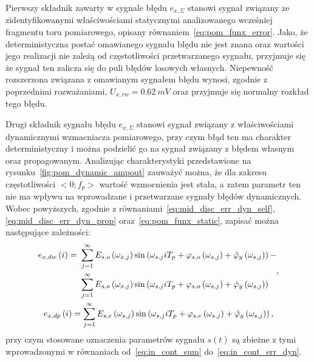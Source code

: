 Pierwszy składnik zawarty w sygnale błędu $e_{x,\Sigma}$ stanowi sygnał związany ze zidentyfikowanymi właściwościami statycznymi analizowanego wcześniej fragmentu toru pomiarowego, opisany równaniem~\eqref{eq:pom_funx_error}. Jako, że deterministyczna postać omawianego sygnału błędu nie jest znana oraz wartości jego realizacji nie zależą od częstotliwości przetwarzanego sygnału, przyjmuje się że sygnał ten zalicza się do puli błędów losowych własnych. Niepewność rozszerzona związana z omawianym sygnałem błędu wynosi, zgodnie z poprzednimi rozważaniami, $U_{x,rw} = \qty{0.62}{mV}$ oraz przyjmuje się normalny rozkład tego błędu.

Drugi składnik sygnału błędu $e_{x,\Sigma}$ stanowi sygnał związany z właściwościami dynamicznymi wzmacniacza pomiarowego, przy czym błąd ten ma charakter deterministyczny i można podzielić go na sygnał związany z błędem własnym oraz propagowanym. Analizując charakterystyki przedstawione na rysunku~\ref{fig:pom_dynamic_ampout} zauważyć można, że dla zakresu częstotliwości $<0; f_{p}>$ wartość wzmocnienia jest stała, a zatem parametr ten nie ma wpływu na wprowadzane i przetwarzane sygnały błędów dynamicznych. Wobec powyższych, zgodnie z równaniami~\eqref{eq:mid_disc_err_dyn_self}, \eqref{eq:mid_disc_err_dyn_prop} oraz~\eqref{eq:pom_funx_static}, zapisać można następujące zależności:
\begin{gather}
\begin{split}
e_{x,dw} \left(i\right) =~
& \sum _{j = 1} ^{\infty} E_{s,o} \left(\omega_{x,j}\right) \sin \left( \omega_{s,j} iT_{p} + \varphi_{s,o} \left(\omega_{s,j}\right) + \tilde{\varphi}_{y} \left(\omega_{s,j}\right) \right) - \\
& \sum _{j = 1} ^{\infty} E_{s,o} \left(\omega_{x,j}\right) \sin \left( \omega_{s,j} iT_{p} + \varphi_{s,o} \left(\omega_{s,j}\right) + \dot{\varphi}_{y} \left(\omega_{s,j}\right) \right)
\end{split}
\label{eq:pom_errx_dyn_self}, \\
e_{x,dp} \left(i\right) = \sum _{j = 1} ^{\infty} E_{s,e} \left(\omega_{s,j}\right) \sin \left( \omega_{s,j} iT_{p} + \varphi_{s,e} \left(\omega_{s,j}\right) + \tilde{\varphi}_{y} \left(\omega_{s,j}\right) \right) \label{eq:pom_errx_dyn_prop},
\end{gather}
przy czym stosowane oznaczenia parametrów sygnału $s(t)$ są zbieżne z tymi wprowadzonymi w równaniach od~\eqref{eq:in_cont_sum} do~\eqref{eq:in_cont_err_dyn}.

